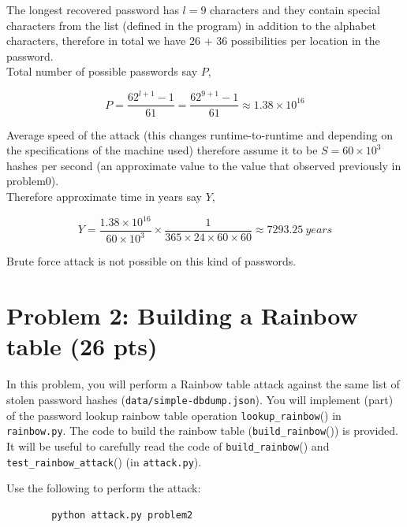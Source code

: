 \documentclass[11pt,letterpaper]{article}
\newenvironment{answer}{\em \color{blue} \begin{adjustwidth}{1cm}{1cm}}{\end{adjustwidth}}
\begin{document}
\begin{enumerate}
\begin{answer}
						
			
			The longest recovered password has $l=9$ characters and they contain special characters from the list (defined in the program) in addition to the alphabet characters, therefore in total we have 26 + 36 possibilities per location in the password.\\
			
			Total number of possible passwords say $P$,
			
			\[
			P = \frac{62^{l+1}-1}{61} = \frac{62^{9+1}-1}{61} \approx 1.38 \times 10^{16}
			\]
			
			Average speed of the attack (this changes runtime-to-runtime and depending on the specifications of the machine used) therefore assume it to be $S = 60 \times 10^{3}$ hashes per second (an approximate value to the value that observed previously in problem0).\\
			
			Therefore approximate time in years say $Y$,
			
			\[
			Y = \frac{1.38 \times 10^{16}}{60 \times 10^{3}} \times \frac{1}{365 \times 24 \times 60 \times 60} \approx 7293.25 ~years 
			\]
			
			Brute force attack is not possible on this kind of passwords.
			
		\end{answer}
		
	\end{enumerate}
	
	\newpage
	\section*{Problem 2: Building a Rainbow table ({26 pts})}
	
	In this problem, you will perform a Rainbow table attack against the same list of stolen password hashes (\texttt{data/simple-dbdump.json}). You will implement (part) of the password lookup rainbow table operation \texttt{lookup\_rainbow}() in \texttt{rainbow.py}. The code to build the rainbow table (\texttt{build\_rainbow}()) is provided. It will be useful to carefully read the code of \texttt{build\_rainbow}() and \texttt{test\_rainbow\_attack}() (in \texttt{attack.py}).
	
	Use the following to perform the attack:
	\begin{Verbatim}
		python attack.py problem2
	\end{Verbatim}
	
\end{document}
